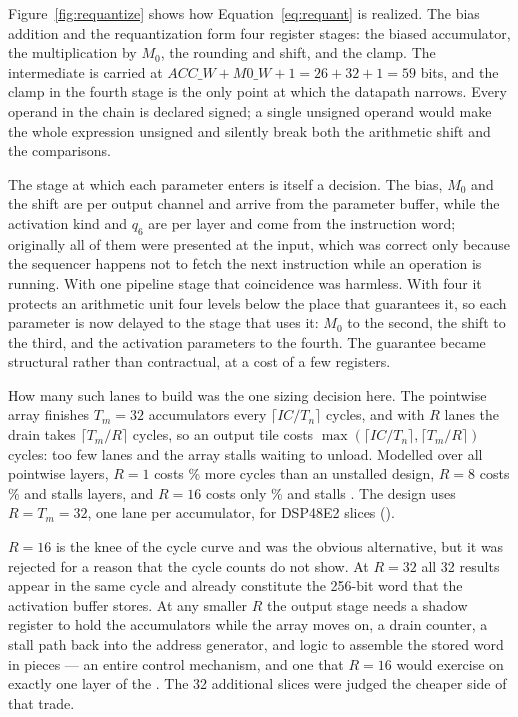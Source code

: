 Figure~\ref{fig:requantize} shows how Equation~\eqref{eq:requant} is realized.
The bias addition and the requantization form four register stages: the biased
accumulator, the multiplication by $M_0$, the rounding and shift, and the
clamp. The intermediate is carried at
$\mathit{ACC\_W} + \mathit{M0\_W} + 1 = 26 + 32 + 1 = 59$ bits, and the clamp
in the fourth stage is the only point at which the datapath narrows. Every
operand in the chain is declared signed; a single unsigned operand would make
the whole expression unsigned and silently break both the arithmetic shift and
the comparisons.

The stage at which each parameter enters is itself a decision. The bias, $M_0$
and the shift are per output channel and arrive from the parameter buffer,
while the activation kind and $q_6$ are per layer and come from the
instruction word; originally all of them were presented at the input, which
was correct only because the sequencer happens not to fetch the next
instruction while an operation is running. With one pipeline stage that
coincidence was harmless. With four it protects an arithmetic unit four levels
below the place that guarantees it, so each parameter is now delayed to the
stage that uses it: $M_0$ to the second, the shift to the third, and the
activation parameters to the fourth. The guarantee became structural rather
than contractual, at a cost of a few registers.

How many such lanes to build was the one sizing decision here. The pointwise
array finishes $T_m = 32$ accumulators every $\lceil IC/T_n \rceil$ cycles, and
with $R$ lanes the drain takes $\lceil T_m / R \rceil$ cycles, so an output
tile costs $\max(\lceil IC/T_n \rceil, \lceil T_m/R \rceil)$ cycles: too few
lanes and the array stalls waiting to unload. Modelled over all
\thPwLayers{} pointwise layers, $R = 1$ costs \thRqPenaltyOne\% more cycles
than an unstalled design, $R = 8$ costs \thRqPenaltyEight\% and stalls
\thRqStalledEight{} layers, and $R = 16$ costs only \thRqPenaltySixteen\% and
stalls \thRqStalledSixteen. The design uses $R = T_m = 32$, one lane per
accumulator, for \thRqDsp{} DSP48E2 slices ().

$R = 16$ is the knee of the cycle curve and was the obvious alternative, but it
was rejected for a reason that the cycle counts do not show. At $R = 32$ all
32 results appear in the same cycle and already constitute the 256-bit word
that the activation buffer stores. At any smaller $R$ the output stage needs a
shadow register to hold the accumulators while the array moves on, a drain
counter, a stall path back into the address generator, and logic to assemble
the stored word in pieces --- an entire control mechanism, and one that
$R = 16$ would exercise on exactly one layer of the \thPwLayers{}. The 32
additional slices were judged the cheaper side of that trade.

